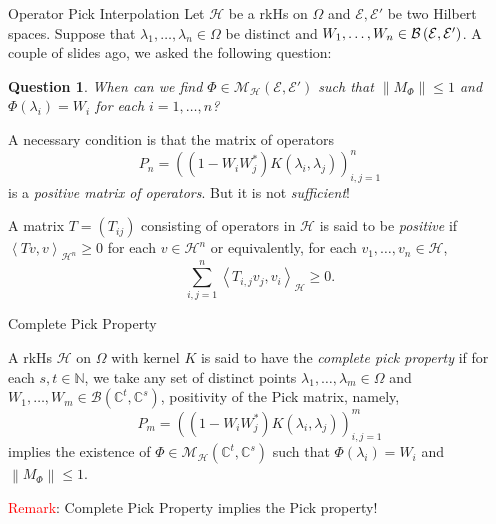 \documentclass{beamer}
\newtheorem{question}[theorem]{Question}
\newcommand{\N}{\mathbb N}
\newcommand{\C}{\mathbb C}
\newcommand{\calB}{{\mathcal B}}
\newcommand{\calE}{{\mathcal E}}
\newcommand{\calH}{{\mathcal H}}
\newcommand{\calM}{{\mathcal M}}
\newcommand{\ip}[1]{\left\langle #1 \right\rangle}
\newcommand{\norm}[1]{\left\lVert #1 \right\rVert}
\begin{document}
\begin{frame}{Operator Pick Interpolation}
Let $\calH$ be a rkHs on $\Omega$ and $\calE , \calE'$ be two Hilbert spaces.
\pause
Suppose that $\lambda_{1}, \ldots, \lambda_{n} \in \Omega$ be distinct and $W_{1}, \ldots , W_{n} \in \cal{B} \left( \calE , \calE' \right)$. A couple of slides ago, we asked the following question:
\begin{question}
When can we find $\Phi \in \calM_{\calH} \left( \calE , \calE' \right)$ such that $\norm{M_{\Phi}} \le 1$ and $\Phi \left( \lambda_{i} \right) = W_{i}$ for each $i=1, \ldots , n$?
\end{question}
\pause
A necessary condition is that the matrix of operators
\begin{equation*}
P_{n} = \left( \left( 1-W_{i} W_{j}^{*} \right) K\left( \lambda_{i}, \lambda_{j} \right) \right)_{i,j=1}^{n}
\end{equation*}
is a \textit{positive matrix of operators}. But it is not \textit{sufficient}!

\pause
\begin{definition}
A matrix $T=\left( T_{ij} \right)$ consisting of operators in $\calH$ is said to be \textit{positive} if $\ip{Tv,v}_{\calH ^{n}} \ge 0$ for each $v\in \calH ^{n}$
or equivalently, for each $v_{1}, \ldots , v_{n} \in \calH$,
\begin{equation*}
\sum_{i,j=1}^{n} \ip{T_{i,j} v_{j}, v_{i}}_{\calH} \ge 0.
\end{equation*}
\end{definition}
\end{frame}

\begin{frame}{Complete Pick Property}
\begin{definition}
A rkHs $\calH$ on $\Omega$ with kernel $K$ is said to have the \textit{complete pick property} if for each $s,t \in \N$, we take any set of distinct points $\lambda_{1}, \ldots , \lambda_{m} \in \Omega$ and $W_{1}, \ldots , W_{m} \in \calB \left( \C ^{t}, \C^{s} \right)$, positivity of the Pick matrix, namely,
\begin{equation*}
P_{m} = \left( \left( 1-W_{i} W_{j}^{*} \right) K\left( \lambda_{i}, \lambda_{j} \right) \right)_{i,j=1}^{m}
\end{equation*}
implies the existence of $\Phi \in \calM_{\calH} \left( \C ^{t}, \C ^{s} \right)$ such that $\Phi \left( \lambda_{i} \right) = W_{i}$ and $\norm{M_{\Phi}} \le 1$.
\end{definition}
\pause

\textcolor{red}{Remark}: Complete Pick Property implies the Pick property!

\end{frame}
\end{document}
